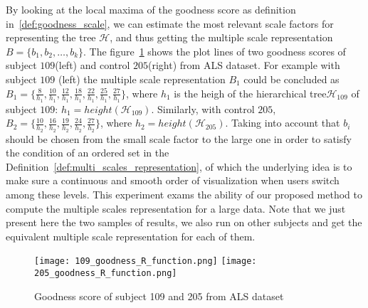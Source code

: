 \vspace{0.5mm}
By looking at the local maxima of the goodness score as definition in~\ref{def:goodness_scale}, we can estimate the most relevant scale factors for representing the tree $\mathcal{H}$, and thus getting the multiple scale representation $\mathsf{\textit{B}} = \{b_1, b_2, \ldots, b_k\}$. The figure~\ref{fig:goodness_score} shows the plot lines of two goodness scores of subject $109$(left) and control $205$(right) from ALS dataset. 
For example with subject $109$ (left) the multiple scale representation $\mathsf{\textit{B}}_{1}$ could be concluded as $\mathsf{\textit{B}}_{1} = \{\frac{8}{h_1}, \frac{10}{h_1}, \frac{12}{h_1}, \frac{18}{h_1}, \frac{22}{h_1},\frac{25}{h_1},\frac{27}{h_1}\}$, where $h_1$ is the heigh of the hierarchical tree$\mathcal{H}_{109}$ of subject $109$: $h_1= height(\mathcal{H}_{109})$. Similarly, with control $205$, $\mathsf{\textit{B}}_{2} = \{\frac{10}{h_2}, \frac{16}{h_2}, \frac{19}{h_2}, \frac{24}{h_2},\frac{27}{h_2}\}$, where $h_2= height(\mathcal{H}_{205})$. Taking into account that $b_i$ should be chosen from the small scale factor to the large one in order to satisfy the condition of an ordered set in the Definition~\ref{def:multi_scales_representation}, of which the underlying idea is to make sure a continuous and smooth order of visualization when users switch among these levels. This experiment exams the ability of our proposed method to compute the multiple scales representation for a large data. Note that we just present here the two samples of results, we also run on other subjects and get the equivalent multiple scale representation for each of them.
\begin{figure}
  \centering
  \texttt{[image: 109\_goodness\_R\_function.png]}
  \texttt{[image: 205\_goodness\_R\_function.png]}
  \caption{Goodness score of subject 109 and 205 from ALS dataset}%
  \label{fig:goodness_score}
\end{figure}

